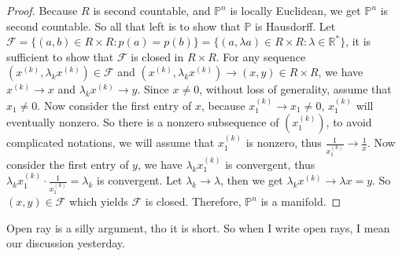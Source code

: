 \documentclass[12pt, a4paper]{article}
\theoremstyle{plain}
\newcommand{\R}{\mathbb{R}}
\newcommand{\F}{\mathcal{F}}
\begin{document}
\begin{proof}
	Because $R$ is second countable, and $\mathbb{P}^n$ is locally Euclidean, we get $\mathbb{P}^n$ is second countable. So all that left is to show that $\mathbb{P}$ is Hausdorff. Let $\F=\{(a,b)\in R\times R: p(a)=p(b)\}= \{(a,\lambda a)\in R\times R:\lambda\in \R^*\}$, it is sufficient to show that $\F$ is closed in $R\times R$. For any sequence $(x^{(k)},\lambda_kx^{(k)})\in \F$ and $(x^{(k)},\lambda_k x^{(k)})\rightarrow (x,y)\in R\times R$, we have $x^{(k)}\rightarrow x$ and $\lambda_k x^{(k)}\rightarrow y$. Since $x\neq 0$, without loss of generality, assume that $x_1\neq 0$.	Now consider the first entry of $x$, because $x_1^{(k)}\rightarrow x_1\neq 0$, $x_1^{(k)}$ will eventually nonzero. So there is a nonzero subsequence of $(x_1^{(k)})$, to avoid complicated notations, we will assume that $x_1^{(k)}$ is nonzero, thus $\frac{1}{x_1^{(k)}}\rightarrow \frac{1}{x}$. Now consider the first entry of $y$, we have $\lambda_k x_1^{(k)}$ is convergent, thus $\lambda_k x_1^{(k)}\cdot \frac{1}{x_1^{(k)}} = \lambda_k$ is convergent. Let $\lambda_k\rightarrow \lambda$, then we get $\lambda_k x^{(k)}\rightarrow \lambda x=y$. So $(x,y)\in \F$ which yields $\F$ is closed. Therefore, $\mathbb{P}^n$ is a manifold.
	\end{proof}
	Open ray is a silly argument, tho it is short. So when I write open rays, I mean our discussion yesterday.
\end{document}
